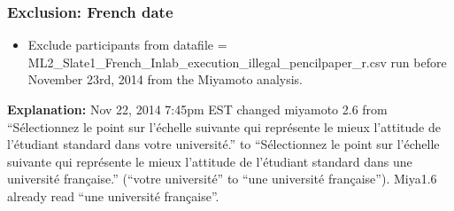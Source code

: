\documentclass[]{article}
\newenvironment{Shaded}{\begin{snugshade}}{\end{snugshade}}
\newcommand{\KeywordTok}[1]{\textcolor[rgb]{0.94,0.87,0.69}{{#1}}}
\newcommand{\DataTypeTok}[1]{\textcolor[rgb]{0.87,0.87,0.75}{{#1}}}
\newcommand{\DecValTok}[1]{\textcolor[rgb]{0.86,0.86,0.80}{{#1}}}
\newcommand{\StringTok}[1]{\textcolor[rgb]{0.80,0.58,0.58}{{#1}}}
\newcommand{\OtherTok}[1]{\textcolor[rgb]{0.94,0.94,0.56}{{#1}}}
\newcommand{\NormalTok}[1]{\textcolor[rgb]{0.80,0.80,0.80}{{#1}}}
\begin{document}
\begin{Shaded}
\end{Shaded}

\subsubsection{\textbf{Exclusion:} French
date}\label{exclusion-french-date}

\begin{itemize}
\itemsep1pt\parskip0pt
\item
  Exclude participants from datafile =
  ML2\_Slate1\_French\_Inlab\_execution\_illegal\_pencilpaper\_r.csv run
  before November 23rd, 2014 from the Miyamoto analysis.
\end{itemize}

\textbf{Explanation:} Nov 22, 2014 7:45pm EST changed miyamoto 2.6 from
``Sélectionnez le point sur l'échelle suivante qui représente le mieux
l'attitude de l'étudiant standard dans votre université.'' to
``Sélectionnez le point sur l'échelle suivante qui représente le mieux
l'attitude de l'étudiant standard dans une université française.''
(``votre université'' to ``une université française''). Miya1.6 already
read ``une université française''.
\end{document}
